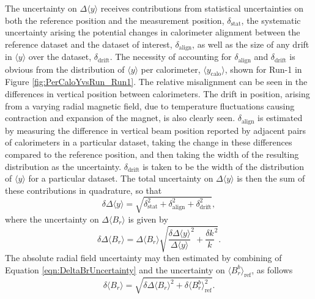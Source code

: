 The uncertainty on $\Delta \langle y \rangle$ receives contributions from statistical uncertainties on both the reference position and the measurement position, $\delta_{\text{stat}}$, the systematic uncertainty arising the potential changes in calorimeter alignment between the reference dataset and the dataset of interest, $\delta_{\text{align}}$, as well as the size of any drift in $\langle y \rangle$ over the dataset, $\delta_{\text{drift}}$. The necessity of accounting for $\delta_{\text{align}}$ and  $\delta_{\text{drift}}$ is obvious from the distribution of $\langle y \rangle$ per calorimeter, $\langle y_{\text{calo}} \rangle$, shown for Run-1 in Figure \ref{fig:PerCaloYvsRun_Run1}. The relative misalignment can be seen in the differences in vertical position between calorimeters. The drift in position, arising from a varying radial magnetic field, due to temperature fluctuations causing contraction and expansion of the magnet, is also clearly seen. $\delta_{\text{align}}$ is estimated by measuring the difference in vertical beam position reported by adjacent pairs of calorimeters in a particular dataset, taking the change in these differences compared to the reference position, and then taking the width of the resulting distribution as the uncertainty. $\delta_{\text{drift}}$ is taken to be the width of the distribution of $\langle y \rangle$ for a particular dataset. The total uncertainty on $\Delta \langle y \rangle$ is then the sum of these contributions in quadrature, so that
%
\begin{equation}
  \delta\Delta \langle y \rangle = \sqrt{\delta_{\text{stat}}^{2}+\delta_{\text{align}}^{2}+\delta_{\text{drift}}^{2}},
  \label{DeltaPositionUncertainty}
\end{equation}
%
where the uncertainty on $\Delta \langle B_{r} \rangle$ is given by
%
\begin{equation}
  \delta\Delta \langle B_{r} \rangle = \Delta \langle B_{r} \rangle \sqrt{ \frac{\delta \Delta \langle y \rangle}{\Delta \langle y \rangle}^{2} + \frac{\delta k}{k}^{2} }.
  \label{eqn:DeltaBrUncertainty}
\end{equation}
%
The absolute radial field uncertainty may then estimated by combining of Equation \ref{eqn:DeltaBrUncertainty} and the uncertainty on $\langle B_{r}^{b} \rangle_{\text{ref}}$, as follows
%
\begin{equation}
  \delta\langle B_{r} \rangle = \sqrt{\delta\Delta\langle B_{r} \rangle^{2} + \delta\langle B_{r}^{b} \rangle_{\text{ref}}^{2}}.
  \label{eqn:EstimatedBrUncertainty}
\end{equation}
%

